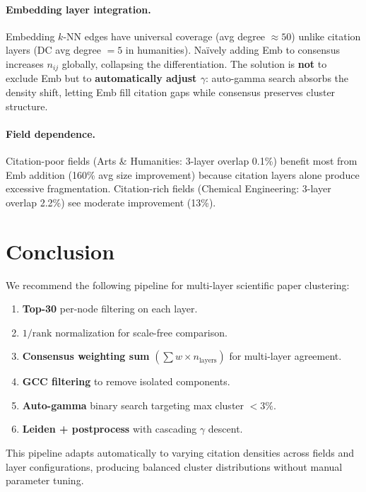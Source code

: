 \documentclass[11pt,a4paper]{article}
\begin{document}
\paragraph{Embedding layer integration.} Embedding $k$-NN edges have universal coverage (avg degree $\approx 50$) unlike citation layers (DC avg degree $= 5$ in humanities). Na\"ively adding Emb to consensus increases $n_{ij}$ globally, collapsing the differentiation. The solution is \textbf{not} to exclude Emb but to \textbf{automatically adjust $\gamma$}: auto-gamma search absorbs the density shift, letting Emb fill citation gaps while consensus preserves cluster structure.

\paragraph{Field dependence.} Citation-poor fields (Arts \& Humanities: 3-layer overlap 0.1\%) benefit most from Emb addition (160\% avg size improvement) because citation layers alone produce excessive fragmentation. Citation-rich fields (Chemical Engineering: 3-layer overlap 2.2\%) see moderate improvement (13\%).

\section{Conclusion}

We recommend the following pipeline for multi-layer scientific paper clustering:

\begin{enumerate}[nosep]
    \item \textbf{Top-30} per-node filtering on each layer.
    \item \textbf{$1/\text{rank}$} normalization for scale-free comparison.
    \item \textbf{Consensus weighting sum} $(\sum w \times n_{\text{layers}})$ for multi-layer agreement.
    \item \textbf{GCC filtering} to remove isolated components.
    \item \textbf{Auto-gamma} binary search targeting max cluster $< 3\%$.
    \item \textbf{Leiden + postprocess} with cascading $\gamma$ descent.
\end{enumerate}

This pipeline adapts automatically to varying citation densities across fields and layer configurations, producing balanced cluster distributions without manual parameter tuning.
\end{document}
